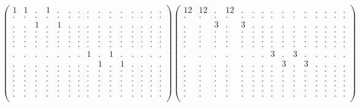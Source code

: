 \documentclass[12pt,a4paper]{amsart}
\begin{document}
\begin{align*}
\left(\begin{array}{rrrrrrrrrrrrrrr}%
1&1&.&1&.&.&.&.&.&.&.&.&.&.&.\\%
.&.&.&.&.&.&.&.&.&.&.&.&.&.&.\\%
.&.&1&.&1&.&.&.&.&.&.&.&.&.&.\\%
.&.&.&.&.&.&.&.&.&.&.&.&.&.&.\\%
.&.&.&.&.&.&.&.&.&.&.&.&.&.&.\\%
.&.&.&.&.&.&.&.&.&.&.&.&.&.&.\\%
.&.&.&.&.&.&.&.&.&.&.&.&.&.&.\\%
.&.&.&.&.&.&.&1&.&1&.&.&.&.&.\\%
.&.&.&.&.&.&.&.&1&.&1&.&.&.&.\\%
.&.&.&.&.&.&.&.&.&.&.&.&.&.&.\\%
.&.&.&.&.&.&.&.&.&.&.&.&.&.&.\\%
.&.&.&.&.&.&.&.&.&.&.&.&.&.&.\\%
.&.&.&.&.&.&.&.&.&.&.&.&.&.&.\\%
.&.&.&.&.&.&.&.&.&.&.&.&.&.&.\\%
.&.&.&.&.&.&.&.&.&.&.&.&.&.&.\\%
\end{array}\right)%
\left(\begin{array}{rrrrrrrrrrrrrrr}%
12&12&.&12&.&.&.&.&.&.&.&.&.&.&.\\%
.&.&.&.&.&.&.&.&.&.&.&.&.&.&.\\%
.&.&3&.&3&.&.&.&.&.&.&.&.&.&.\\%
.&.&.&.&.&.&.&.&.&.&.&.&.&.&.\\%
.&.&.&.&.&.&.&.&.&.&.&.&.&.&.\\%
.&.&.&.&.&.&.&.&.&.&.&.&.&.&.\\%
.&.&.&.&.&.&.&.&.&.&.&.&.&.&.\\%
.&.&.&.&.&.&.&3&.&3&.&.&.&.&.\\%
.&.&.&.&.&.&.&.&3&.&3&.&.&.&.\\%
.&.&.&.&.&.&.&.&.&.&.&.&.&.&.\\%
.&.&.&.&.&.&.&.&.&.&.&.&.&.&.\\%
.&.&.&.&.&.&.&.&.&.&.&.&.&.&.\\%
.&.&.&.&.&.&.&.&.&.&.&.&.&.&.\\%
.&.&.&.&.&.&.&.&.&.&.&.&.&.&.\\%
.&.&.&.&.&.&.&.&.&.&.&.&.&.&.\\%
\end{array}\right)%
\end{align*}
\end{document}
